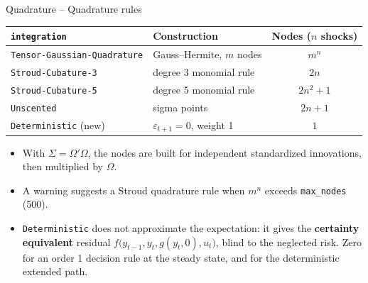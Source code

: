\documentclass[11pt,aspectratio=169]{beamer}
\newcommand{\code}[1]{\texttt{#1}}
\begin{document}
\begin{frame}{Quadrature -- Quadrature rules}

\begin{center}
    \small
    \renewcommand{\arraystretch}{1.1}
    \begin{tabular}{llc}
        \toprule
        \code{integration} & Construction & Nodes ($n$ shocks) \\
        \midrule
        \code{Tensor-Gaussian-Quadrature} & Gauss--Hermite, $m$ nodes & $m^n$ \\
        \code{Stroud-Cubature-3} & degree 3 monomial rule & $2n$ \\
        \code{Stroud-Cubature-5} & degree 5 monomial rule & $2n^2+1$ \\
        \code{Unscented} & sigma points & $2n+1$ \\
        \code{Deterministic} (new) & $\varepsilon_{t+1}=0$, weight 1 & $1$ \\
        \bottomrule
    \end{tabular}
\end{center}

\begin{itemize}

\item With $\Sigma = \Omega'\Omega$, the nodes are built for independent standardized innovations, then multiplied by $\Omega$.\newline

\item A warning suggests a Stroud quadrature rule when $m^n$ exceeds \code{max\_nodes} (500).\newline

\item \code{Deterministic} does not approximate the expectation: it gives the \textbf{certainty equivalent} residual $f\big(y_{t-1}, y_t, g(y_t, 0), u_t\big)$, blind to the neglected risk. Zero for an order 1 decision rule at the steady state, and for the deterministic extended path.

\end{itemize}

\end{frame}
\end{document}
